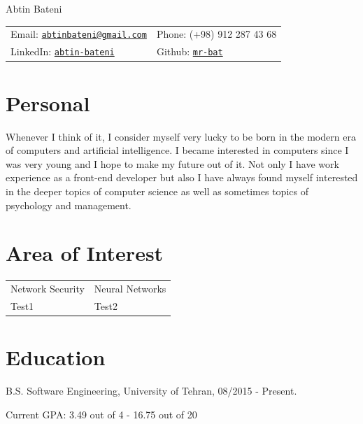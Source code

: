 \documentclass[letterpaper]{article}
\def\name{Abtin Bateni}
\renewenvironment{itemize}{
  \begin{list}{}{
    \setlength{\leftmargin}{1.5em}
  }
}{
  \end{list}
}
\begin{document}
{\huge \name}


\vspace{0.25in}

\begin{minipage}{0.95\linewidth}
    \begin{tabular}{ll}
         Email:  \href{mailto:abtinbateni@gmail.com}{\tt abtinbateni@gmail.com}
        & Phone: (+98) 912 287 43 68 \\
         LinkedIn:  \href{http://www.linkedin.com/in/abtin-bateni/}{\tt abtin-bateni}
        & Github: \href{http://www.github.com/mr-bat/}{\tt mr-bat} \\
    \end{tabular}
\end{minipage}


\section*{Personal}
\begin{itemize}
\item \hspace{10pt} Whenever I think of it, I consider myself very lucky to be born in the modern era of computers and artificial intelligence. I became interested in computers since I was very young and I hope to make my future out of it. Not only I have work experience as a front-end developer but also I have always found myself interested in the deeper topics of computer science as well as sometimes topics of psychology and management.
\end{itemize}

\section*{Area of Interest}
\begin{tabular}{l l}
    Network Security\hspace*{20pt} & Neural Networks \\
    Test1 & Test2
\end{tabular}

\section*{Education}

\begin{itemize}
  \item B.S. Software Engineering, University of Tehran, 08/2015 - Present.
    \begin{itemize}
        \item{Current GPA: 3.49 out of 4 - 16.75 out of 20}
    \end{itemize}
\end{itemize}
\end{document}
